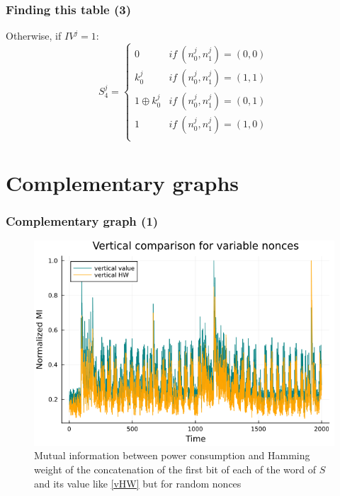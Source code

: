 \documentclass{beamer}
\begin{document}
	\begin{frame}
		\frametitle{Finding this table (3)}
		\noindent Otherwise, if $IV^j = 1$:
		$$S _4^j =\left \{	
		\begin{array}{ll}
			0& if\ (n_0^j,n_1^j)=(0,0)\\
			k_0^j& if\ (n_0^j,n_1^j)=(1,1)\\
			1 \oplus k_0^j& if\ (n_0^j,n_1^j)=(0,1)\\
			1& if\ (n_0^j,n_1^j)=(1,0)\\
		\end{array}
		\right.$$
	\end{frame}
	
	\section{Complementary graphs}
	\begin{frame}
		\frametitle{Complementary graph (1)}
		\begin{figure}[H]
			\centering
			\includegraphics[scale=0.3]{img_files/vertical_one_byte}
			\caption{Mutual information between power consumption and Hamming weight of the concatenation of the first bit of each of the word of $S$ and its value like \ref{vHW} but for random nonces}
			\label{vHW&val}
		\end{figure}
	\end{frame}
	
\end{document}
